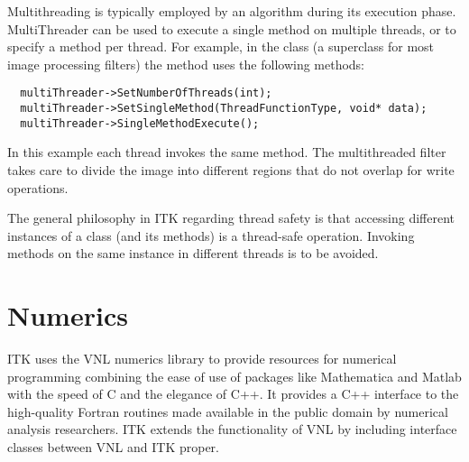 Multithreading is typically employed by an algorithm during its execution
phase. MultiThreader can be used to execute a single method on
multiple threads, or to specify a method per thread. For example, in the
class  (a superclass for most image processing filters)
the  method uses the following methods:

\small
\begin{verbatim}
  multiThreader->SetNumberOfThreads(int);
  multiThreader->SetSingleMethod(ThreadFunctionType, void* data);
  multiThreader->SingleMethodExecute();
\end{verbatim}
\normalsize

In this example each thread invokes the same method. The multithreaded filter
takes care to divide the image into different regions that do not overlap for
write operations.

The general philosophy in ITK regarding thread safety is that accessing
different instances of a class (and its methods) is a thread-safe operation.
Invoking methods on the same instance in different threads is to be avoided.


\section{Numerics}
\label{sec:Numerics}


ITK uses the VNL numerics library to provide resources for numerical
programming combining the ease of use of packages like Mathematica and Matlab
with the speed of C and the elegance of C++. It provides a C++ interface to
the high-quality Fortran routines made available in the public domain by
numerical analysis researchers. ITK extends the functionality of VNL
by including interface classes between VNL and ITK proper.

